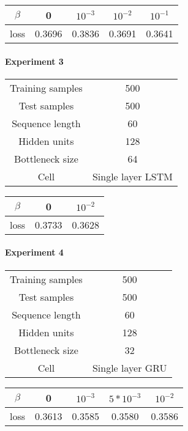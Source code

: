 \documentclass[a4paper]{article}
\begin{document}
\begin{center}
\begin{tabular}{ c | c c c c}
 $\beta$ & 0 & $10^{-3}$ & $10^{-2}$ & $10^{-1}$ \\ 
  \hline
 loss & 0.3696 &  0.3836  &  0.3691  &  0.3641 \\  
\end{tabular}
\end{center}

\paragraph{Experiment 3}
\begin{center}
\begin{tabular}{ c | c  }
 Training samples & 500 \\ 
 Test samples &  500 \\
 Sequence length & 60 \\
 Hidden units & 128 \\
 Bottleneck size & 64 \\
 Cell & Single layer LSTM
\end{tabular}
\end{center}

\begin{center}
\begin{tabular}{ c | c c }
 $\beta$ & 0 & $10^{-2}$ \\ 
  \hline
 loss & 0.3733 & 0.3628  \\  
\end{tabular}
\end{center}

\paragraph{Experiment 4}
\begin{center}
\begin{tabular}{ c | c  }
 Training samples & 500 \\ 
 Test samples &  500 \\
 Sequence length & 60 \\
 Hidden units & 128 \\
 Bottleneck size & 32 \\
 Cell & Single layer GRU
\end{tabular}
\end{center}


\begin{center}
\begin{tabular}{ c | c c c c }
 $\beta$ & 0 & $10^{-3}$ & $5*10^{-3}$ & $10^{-2}$ \\ 
  \hline
 loss & 0.3613 & 0.3585 & 0.3580 & 0.3586  \\  
\end{tabular}
\end{center}
\end{document}
